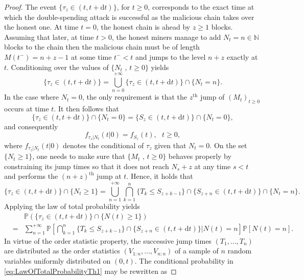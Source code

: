 \begin{proof}
The event $\{\tau_z\in(t,t+\text{d}t)\}$, for $t\geq0$, corresponds to the exact time at which the double-spending attack is successful as the malicious chain takes over the honest one. At time $t=0$, the honest chain is ahead by $z\geq 1$ blocks. Assuming that later, at time $t>0$, the honest miners manage to add $N_t=n\in\mathbb{N}$ blocks to the chain then the malicious chain must be of length $M(t^{-})=n+z-1$ at some time $t^{-}<t$ and jumps to the level $n+z$ exactly at $t$. Conditioning over the values of $\{N_t\text{ , }t\geq0\}$ yields
\begin{equation}\label{eq:Tauz}
\{\tau_z\in(t,t+\text{d}t)\}=\bigcup_{n=0}^{+\infty}\{\tau_z\in(t,t+\text{d}t)\}\cap\{N_t=n\}.
\end{equation}
In the case where $N_t=0$, the only requirement is that the $z^{\text{th}}$ jump of $(M_t)_{t\geq0}$ occurs at time $t$. It then follows that
\begin{equation}\label{eq:TauzNt0}
\{\tau_z\in(t,t+\text{d}t)\}\cap\{N_t=0\}=\{S_{z}\in(t,t+\text{d}t)\}\cap\{N_t=0\},
\end{equation}
and consequently
\begin{equation}\label{eq:PDFTauzNt0}
f_{\tau_z|N_t}(t|0)=f_{S_z}(t),\text{ }t\geq0,
\end{equation}
where $f_{\tau_z|N_t}(t|0)$ denotes the conditional \pdf of $\tau_z$ given that $N_t=0$. On the set $\{N_t\geq1\}$, one needs to make sure that $\{M_t\text{ , }t\geq0\}$ behaves properly by constraining its jump times so that it does not reach $N_s+z$ at any time $s<t$ and performs the $(n+z)^{\text{th}}$ jump at $t$. Hence, it holds that
\begin{equation*}
\{\tau_z\in(t,t+\text{d}t)\}\cap\{N_t\geq1\}=\bigcup_{n=1}^{+\infty}\bigcap_{k=1}^{n}\{T_k\leq S_{z+k-1}\}\cap\{S_{z+n}\in(t,t+\text{d}t)\}\cap\{N_t=n\}.
\end{equation*}
Applying the law of total probability yields
\begin{eqnarray}
&&\mathbb{P}\left(\{\tau_z\in(t,t+\text{d}t)\}\cap\{N(t)\geq1\}\right)\nonumber\\
&=&\sum_{n=1}^{+\infty}\mathbb{P}\left[\bigcap_{k=1}^{n}\{T_k\leq S_{z+k-1}\}\cap\{S_{z+n}\in(t,t+\text{d}t)\}\Big\rvert N(t)=n\right]\mathbb{P}[N(t)=n].\label{eq:LawOfTotalProbabilityTh1}
\end{eqnarray}
In virtue of the order statistic property, the successive jump times $(T_1,\ldots,T_n)$ are distributed as the order statistics $(V_{1:n},\ldots,V_{n:n})$ of a sample of $n$ \iid random variables uniformly distributed on $(0,t)$. The conditional probability in \eqref{eq:LawOfTotalProbabilityTh1} may be rewritten as

\end{proof}
